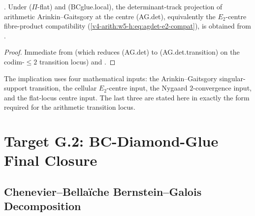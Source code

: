 \begin{corollary}
\label{v4-arith:w6-g:cor:agdet-closed}
\ClaimStatusProvedHereConditional. Under
 (\(\Pi\)-flat) and
 (BCglue.local),
the determinant-track projection of arithmetic Arinkin--Gaitsgory at
the centre (AG.det), equivalently the \(E_{2}\)-centre fibre-product
compatibility (\ref{v4-arith:w5-h:eq:agdet-e2-compat}), is
obtained from .
\end{corollary}

\begin{proof}
Immediate from
 (which reduces (AG.det) to
(AG.det.transition) on the codim-\(\leq 2\) transition locus) and
.
\end{proof}

\begin{remark}
\label{v4-arith:w6-g:rem:agdet-domain}
The implication uses four mathematical inputs: the
Arinkin--Gaitsgory singular-support transition, the cellular
\(E_{2}\)-centre input, the Nygaard \(2\)-convergence input, and the
flat-locus centre input. The last three are stated here in exactly the
form required for the arithmetic transition locus.
\end{remark}

\section{Target G.2: BC-Diamond-Glue Final Closure}
\label{v4-arith:w6-g:bcglue-final}

\subsection{Chenevier--Bella\"iche Bernstein--Galois Decomposition}

